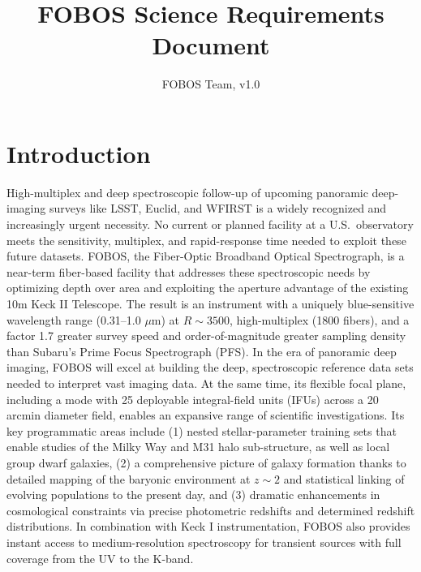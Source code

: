 \documentclass[preprint,11pt]{aastex}
\title{FOBOS Science Requirements Document}
\author{FOBOS Team, v1.0}
\begin{document}
\maketitle


\setcounter{tocdepth}{2}
\setcounter{secnumdepth}{3}
\tableofcontents


\section{Introduction}
\label{srd:intro}

High-multiplex and deep spectroscopic follow-up of upcoming panoramic deep-imaging surveys like LSST, Euclid, and
WFIRST is a widely recognized and increasingly urgent necessity. No current or planned facility at a U.S.~observatory
meets the sensitivity, multiplex, and rapid-response time needed to exploit these future datasets. FOBOS, the
Fiber-Optic Broadband Optical Spectrograph, is a near-term fiber-based facility that addresses these spectroscopic
needs by optimizing depth over area and exploiting the aperture advantage of the existing 10m Keck II Telescope. The
result is an instrument with a uniquely blue-sensitive wavelength range (0.31--1.0 $\mu$m) at $R \sim 3500$,
high-multiplex (1800 fibers), and a factor 1.7 greater survey speed and order-of-magnitude greater sampling density
than Subaru's Prime Focus Spectrograph (PFS). In the era of panoramic deep imaging, FOBOS will excel at building the
deep, spectroscopic reference data sets needed to interpret vast imaging data. At the same time, its flexible focal
plane, including a mode with 25 deployable integral-field units (IFUs) across a 20 arcmin diameter field, enables an
expansive range of scientific investigations. Its key programmatic areas include (1) nested stellar-parameter training
sets that enable studies of the Milky Way and M31 halo sub-structure, as well as local group dwarf galaxies, (2) a
comprehensive picture of galaxy formation thanks to detailed mapping of the baryonic environment at $z \sim 2$ and
statistical linking of evolving populations to the present day, and (3) dramatic enhancements in cosmological
constraints via precise photometric redshifts and determined redshift distributions.  In combination with Keck I
instrumentation, FOBOS also provides instant access to medium-resolution spectroscopy for transient sources with full
coverage from the UV to the K-band.
\end{document}
